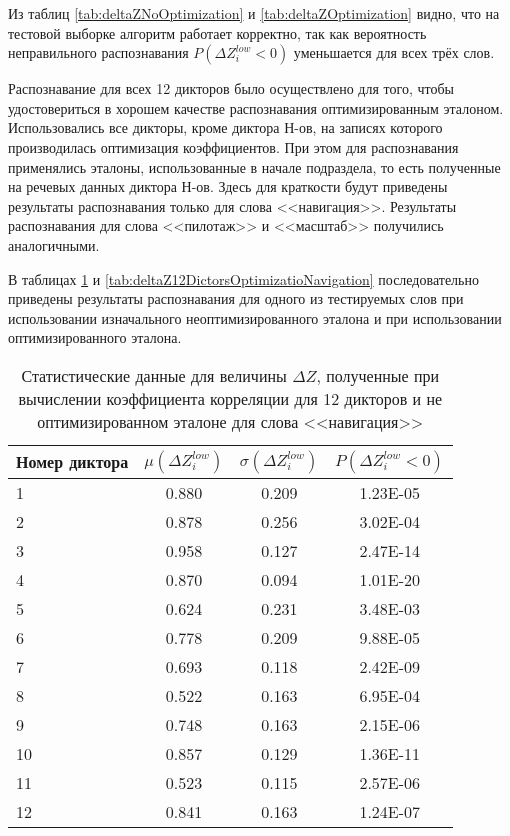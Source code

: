 Из таблиц \ref{tab:deltaZNoOptimization} и \ref{tab:deltaZOptimization} видно, что на тестовой выборке алгоритм работает корректно, так как вероятность неправильного распознавания $P(\Delta Z^{low}_{i} < 0)$ уменьшается для всех трёх слов.

Распознавание для всех 12 дикторов было осуществлено для того, чтобы удостовериться в хорошем качестве распознавания оптимизированным эталоном.
Использовались все дикторы, кроме диктора Н-ов, на записях которого производилась оптимизация коэффициентов.
При этом для распознавания применялись эталоны, использованные в начале подраздела, то есть полученные на речевых данных диктора Н-ов.
Здесь для краткости будут приведены результаты распознавания только для слова <<навигация>>.
Результаты распознавания для слова <<пилотаж>> и <<масштаб>> получились аналогичными.

В таблицах \ref{tab:deltaZ12DictorsNoOptimizatioNavigation} и \ref{tab:deltaZ12DictorsOptimizatioNavigation} последовательно приведены результаты распознавания для одного из тестируемых слов при использовании изначального неоптимизированного эталона и при использовании оптимизированного эталона.

\begin{table}[h]
	\centering
	\caption{Статистические данные для величины $\Delta Z$, полученные при вычислении коэффициента корреляции для 12 дикторов и не оптимизированном эталоне для слова <<навигация>>}
	\label{tab:deltaZ12DictorsNoOptimizatioNavigation}
	\begin{tabular}{| l | c | c | c |}
		\hline
		Номер диктора & \phantom{000} $\mu(\Delta Z^{low}_{i})$ \phantom{000} & \phantom{000} $\sigma(\Delta Z^{low}_{i})$ \phantom{000} & \phantom{000} $P(\Delta Z^{low}_{i} < 0)$ \phantom{000} \\
		\hline
		1	& 0.880	& 0.209	& 1.23E-05 \\
		2	& 0.878	& 0.256	& 3.02E-04 \\
		3	& 0.958	& 0.127	& 2.47E-14 \\
		4	& 0.870	& 0.094	& 1.01E-20 \\
		5	& 0.624	& 0.231	& 3.48E-03 \\
		6	& 0.778	& 0.209	& 9.88E-05 \\
		7	& 0.693	& 0.118	& 2.42E-09 \\
		8	& 0.522	& 0.163	& 6.95E-04 \\
		9	& 0.748	& 0.163	& 2.15E-06 \\
		10	& 0.857	& 0.129	& 1.36E-11 \\
		11	& 0.523	& 0.115	& 2.57E-06 \\
		12	& 0.841	& 0.163	& 1.24E-07 \\
		\hline
	\end{tabular}
\end{table}


